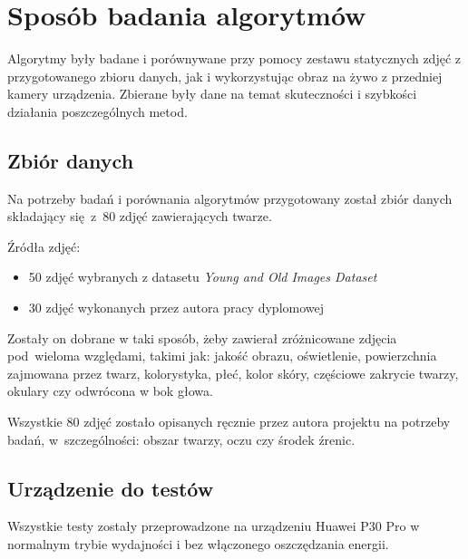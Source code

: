 \newpage 

\section{Sposób badania algorytmów}

Algorytmy były badane i porównywane przy pomocy zestawu statycznych zdjęć z przygotowanego zbioru danych, jak i wykorzystując obraz na żywo z przedniej kamery urządzenia. Zbierane były dane na temat skuteczności i szybkości działania poszczególnych metod.

\subsection{Zbiór danych} \label{section:dataset}

Na potrzeby badań i porównania algorytmów przygotowany został zbiór danych składający się~z~80 zdjęć zawierających twarze. 

\par

Źródła zdjęć:

\begin{itemize}
    \item 50 zdjęć wybranych z datasetu \textit{Young and Old Images Dataset} \cite{young_old_dataset}
    \item 30 zdjęć wykonanych przez autora pracy dyplomowej
\end{itemize}

Zostały on dobrane w taki sposób, żeby zawierał zróżnicowane zdjęcia pod~wieloma względami, takimi jak: jakość obrazu, oświetlenie, powierzchnia zajmowana przez twarz, kolorystyka, płeć, kolor skóry, częściowe zakrycie twarzy, okulary czy odwrócona w bok głowa. 

\par

Wszystkie 80 zdjęć zostało opisanych ręcznie przez autora projektu na potrzeby badań, w~szczególności: obszar twarzy, oczu czy środek źrenic. 

\par

\subsection{Urządzenie do testów}

Wszystkie testy zostały przeprowadzone na urządzeniu Huawei P30 Pro w normalnym trybie wydajności i bez włączonego oszczędzania energii. 